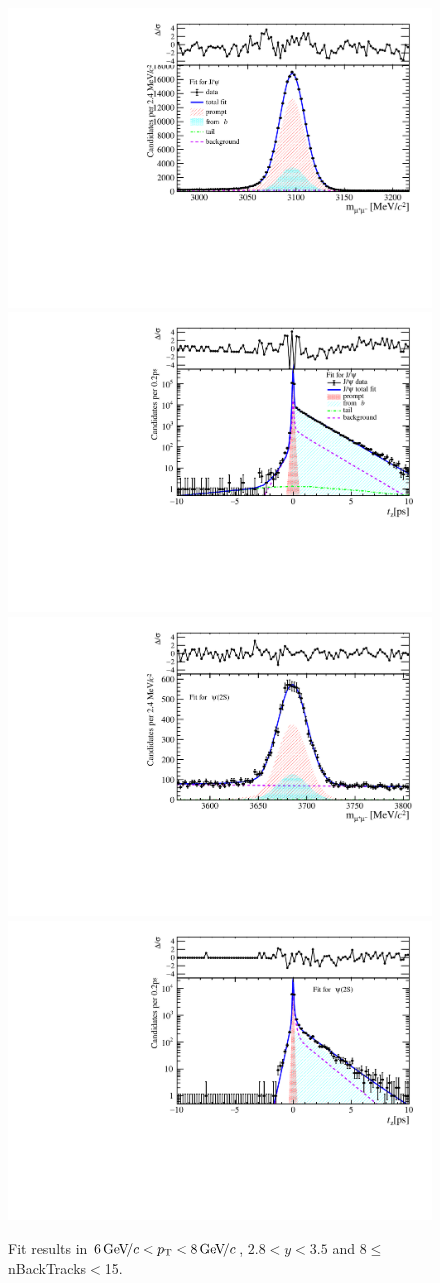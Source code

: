 \begin{figure}[H]
\begin{center}
\includegraphics[width=0.47\linewidth]{pdf/Jpsi/drawmassB/n2y2pt4.pdf}
\includegraphics[width=0.47\linewidth]{pdf/Jpsi/2DFitB/n2y2pt4.pdf}
\vspace*{-0.5cm}
\includegraphics[width=0.47\linewidth]{pdf/Psi2S/drawmassB/n2y2pt4.pdf}
\includegraphics[width=0.47\linewidth]{pdf/Psi2S/2DFitB/n2y2pt4.pdf}
\vspace*{-0.5cm}
\end{center}
\caption{Fit results in $6\text{\,Ge\kern -0.1em V\!/}c<p_{\mathrm{T}}<8\text{\,Ge\kern -0.1em V\!/}c$, $2.8<y<3.5$ and 8$\leq$nBackTracks$<$15.}
\label{Fitn2y2pt4}
\end{figure}
